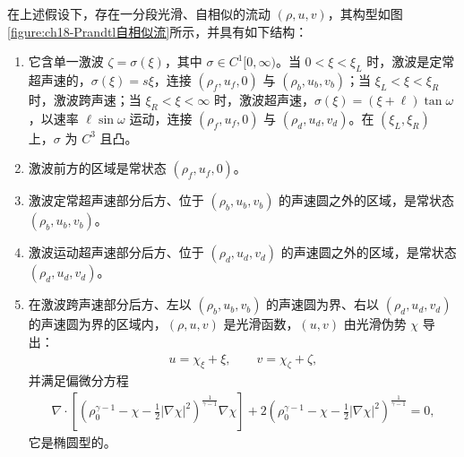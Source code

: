 \documentclass[../../main.tex]{subfiles}
\begin{document}
\begin{theorem}\label{theorem:ch18-Prandtl问题}
在上述假设下，存在一分段光滑、自相似的流动 $(\rho,u,v)$，其构型如图\cref{figure:ch18-Prandtl自相似流}所示，并具有如下结构：
\begin{enumerate}
\item\label{item:ch18-Prandtl-a} 它含单一激波 $\zeta=\sigma(\xi)$，其中 $\sigma\in C^1[0,\infty)$。当 $0<\xi<\xi_L$ 时，激波是定常超声速的，$\sigma(\xi)=s\xi$，连接 $(\rho_f,u_f,0)$ 与 $(\rho_b,u_b,v_b)$；当 $\xi_L<\xi<\xi_R$ 时，激波跨声速；当 $\xi_R<\xi<\infty$ 时，激波超声速，$\sigma(\xi)=(\xi+\ell)\tan\omega$，以速率 $\ell\sin\omega$ 运动，连接 $(\rho_f,u_f,0)$ 与 $(\rho_d,u_d,v_d)$。在 $(\xi_L,\xi_R)$ 上，$\sigma$ 为 $C^3$ 且凸。
\item\label{item:ch18-Prandtl-b} 激波前方的区域是常状态 $(\rho_f,u_f,0)$。
\item\label{item:ch18-Prandtl-c} 激波定常超声速部分后方、位于 $(\rho_b,u_b,v_b)$ 的声速圆之外的区域，是常状态 $(\rho_b,u_b,v_b)$。
\item\label{item:ch18-Prandtl-d} 激波运动超声速部分后方、位于 $(\rho_d,u_d,v_d)$ 的声速圆之外的区域，是常状态 $(\rho_d,u_d,v_d)$。
\item\label{item:ch18-Prandtl-e} 在激波跨声速部分后方、左以 $(\rho_b,u_b,v_b)$ 的声速圆为界、右以 $(\rho_d,u_d,v_d)$ 的声速圆为界的区域内，$(\rho,u,v)$ 是光滑函数，$(u,v)$ 由光滑伪势 $\chi$ 导出：
\begin{align}
u=\chi_\xi+\xi,\qquad v=\chi_\zeta+\zeta,
\label{align:ch18-18414}
\end{align}
并满足偏微分方程
\begin{align}
\nabla\cdot\left[\left(\rho_0^{\gamma-1}-\chi-\frac12|\nabla\chi|^2\right)^{\frac{1}{\gamma-1}}\nabla\chi\right]
+2\left(\rho_0^{\gamma-1}-\chi-\frac12|\nabla\chi|^2\right)^{\frac{1}{\gamma-1}}=0,
\label{align:ch18-18415}
\end{align}
它是椭圆型的。
\end{enumerate}
\end{theorem}
\end{document}
